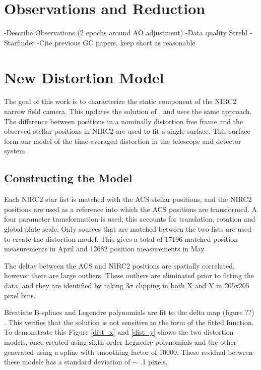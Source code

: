 \section{Observations and Reduction}
-Describe Observations (2 epochs around AO adjustment)
-Data quality Strehl
-Starfinder
-Cite previous GC papers, keep short as reasonable

\section{New Distortion Model}
The goal of this work is to characterize the static component of the NIRC2 narrow field camera.  This updates the solution of \cite{Yelda_2010}, and uses the same approach.  The difference between positions in a nominally distortion free frame and the observed stellar positions in NIRC2 are used to fit a single surface.  This surface form our model of the time-averaged distortion  in the telescope and detector system.

\subsection{Constructing the Model}

Each NIRC2 star list is matched with the ACS stellar positions, and the NIRC2 positions are used as a reference into which the ACS positions are transformed.  A four parameter transformation is used; this accounts for translation, rotation and global plate scale.  Only sources that are matched between the two lists are used to create the distortion model.  This gives a total of 17196 matched position measurements in April and 12682 position measurements in May.  



The deltas between the ACS and NIRC2 positions are spatially correlated, however there are large outliers.  These outliers are eliminated prior to fitting the data, and they are identified by taking 3$\sigma$ clipping in both X and Y in 205x205 pixel bins.  

Bivatiate B-splines and Legendre polynomials are fit to the delta map (figure ??) .  This verifies that the solution is not sensitive to the form of the fitted function.  To demonstrate this Figure \ref{dist_x} and \ref{dist_y} shows the two distortion models, once created using sixth order Legnedre polynomials and the other generated using a spline with smoothing factor of 10000.  These residual between these models has a standard deviation of $\sim$ .1 pixels. 
